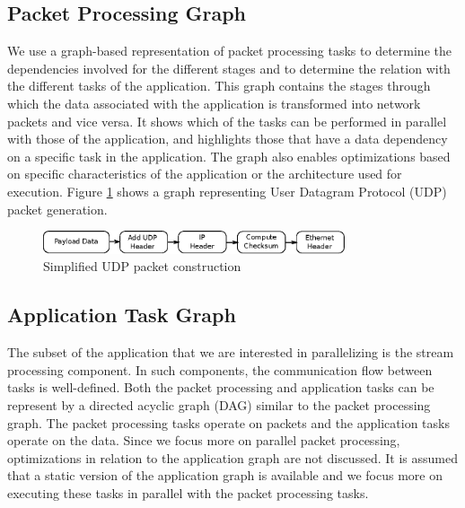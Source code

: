 \documentclass[conference]{IEEEtran}
\newcommand{\comment}[1]{}
\begin{document}
\subsection{Packet Processing Graph}

\comment{Understanding the set of packet processing tasks associated with the application is essential to performing them in parallel.} We use a graph-based representation of packet processing tasks to determine the dependencies involved for the different stages and to determine the relation with the different tasks of the application. This graph contains the stages through which the data associated with the application is transformed into network packets and vice versa. It shows which of the tasks can be performed in parallel with those of the application, and highlights those that have a data dependency on a specific task in the application. The graph also enables optimizations based on specific characteristics of the application or the architecture used for execution. Figure \ref{fig2} shows a graph representing User Datagram Protocol (UDP) packet generation.

\begin{figure}[ht]
\centering
\includegraphics[width=3.5in]{pack-op}
\caption{Simplified UDP packet construction}
\label{fig2}
\end{figure}

\subsection{Application Task Graph}

\comment{Application task graph represents the operations associated in performing the computations.} The subset of the application that we are interested in parallelizing is the stream processing component. In such components, the communication flow between tasks is well-defined. Both the packet processing and application tasks can be represent by a directed acyclic graph (DAG) similar to the packet processing graph. The packet processing tasks operate on packets and the application tasks operate on the data. Since we focus more on parallel packet processing, optimizations in relation to the application graph are not discussed. It is assumed that a static version of the application graph is available and we focus more on executing these tasks in parallel with the packet processing tasks.
\end{document}
